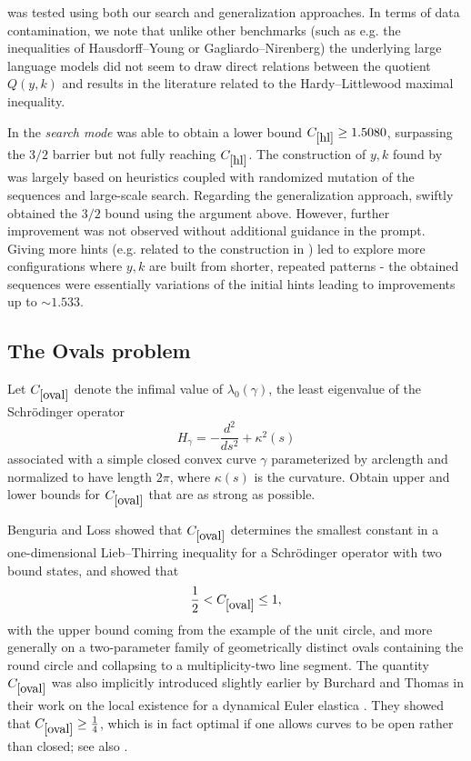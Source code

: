 \AlphaEvolve was tested using both our search and generalization approaches. In terms of data contamination, we note that unlike other benchmarks (such as e.g. the inequalities of Hausdorff--Young or Gagliardo--Nirenberg) the underlying large language models did not seem to draw direct relations between the quotient $Q(y, k)$ and results in the literature related to the Hardy--Littlewood maximal inequality.

In the \textit{search mode} \AlphaEvolve was able to obtain a lower bound $C_{\ref{hl}} \geq 1.5080$, surpassing the $3/2$ barrier but not fully reaching $C_{\ref{hl}}$. The construction of $y, k$ found by \AlphaEvolve was largely based on heuristics coupled with randomized mutation of the sequences and large-scale search. Regarding the generalization approach, \AlphaEvolve swiftly obtained the $3/2$ bound using the argument above. However, further improvement was not observed without additional guidance in the prompt. Giving more hints (e.g. related to the construction in \cite{Aldaz_1998}) led \AlphaEvolve to explore more configurations where $y, k$ are built from shorter, repeated patterns - the obtained sequences were essentially variations of the initial hints leading to improvements up to $\sim 1.533$.

\subsection{The Ovals problem}

\renewcommand{\problemURL}{https://google-deepmind.github.io/alphaevolve_repository_of_problems/problems/19.html}

\begin{problem}\label{oval} Let $C_{\ref{oval}}$ denote the infimal value of $\lambda_0(\gamma)$, the least eigenvalue of the Schr\"odinger operator
\[
H_\gamma = -\frac{d^2}{ds^2} + \kappa^2(s)
\]
associated with a simple closed convex curve $\gamma$ parameterized by arclength and normalized to have length $2\pi$, where $\kappa(s)$ is the curvature.
Obtain upper and lower bounds for $C_{\ref{oval}}$ that are as strong as possible.
\end{problem}

Benguria and Loss \cite{bengurialoss} showed that $C_{\ref{oval}}$ determines the smallest constant in a one-dimensional Lieb--Thirring inequality for
a Schr\"odinger operator with two bound states, and showed that
$$ \frac{1}{2} < C_{\ref{oval}} \leq 1,$$
with the upper bound coming from the example of the unit circle, and more generally on a two-parameter family of
geometrically distinct ovals containing the round circle and collapsing to a multiplicity-two line segment.  The quantity $C_{\ref{oval}}$ was also implicitly introduced slightly earlier by Burchard and Thomas in their work on the local existence for a dynamical Euler elastica \cite{elastica}. They showed that $C_{\ref{oval}} \geq \frac14$, which is in fact optimal if one allows curves to be open rather than closed; see also \cite{burchardovals}. 

